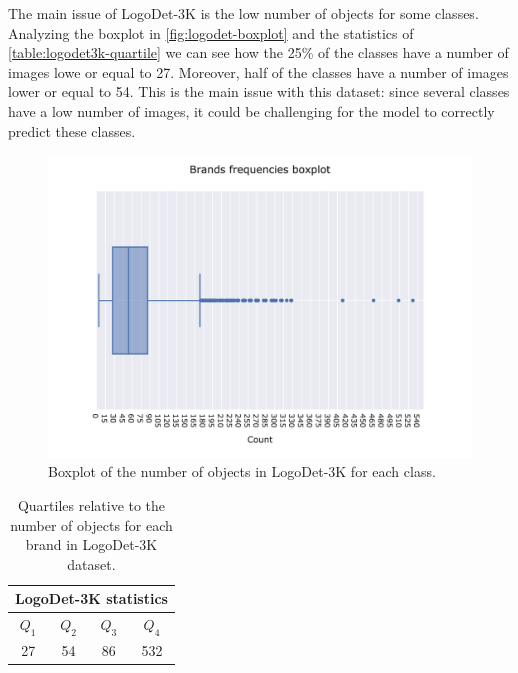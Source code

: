 The main issue of LogoDet-3K is the low number of objects for some classes. Analyzing the boxplot in \autoref{fig:logodet-boxplot} and the statistics of \autoref{table:logodet3k-quartile} we can see how the 25\% of the classes have a number of images lowe or equal to 27. Moreover, half of the classes have a number of images lower or equal to 54. This is the main issue with this dataset: since several classes have a low number of images, it could be challenging for the model to correctly predict these classes.  



\begin{figure}[ht]
	\centering

    \begin{center}
        \includegraphics[width=\columnwidth]{images/box_plot.jpeg}
    \end{center}
	\caption{Boxplot of the number of objects in LogoDet-3K for each class.}%
	\label{fig:logodet-boxplot}%
\end{figure}


\begin{table}[ht]
    \centering
    \begin{tabular}{c  c  c  c } 
     \hline
     \multicolumn{4}{c}{LogoDet-3K statistics}\\
     \hline
     \textbf{$Q_1$} & \textbf{$Q_2$} & \textbf{$Q_3$} & \textbf{$Q_4$} \\
     \hline
     27 & 54 & 86 & 532 \\
    \end{tabular}
    \caption{Quartiles relative to the number of objects for each brand in LogoDet-3K dataset.}
    \label{table:logodet3k-quartile}
\end{table}

